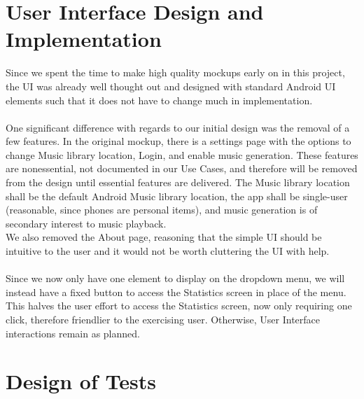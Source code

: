\documentclass[letterpaper,english, 12pt]{scrreprt}
\begin{document}
\chapter{User Interface Design and Implementation}
Since we spent the time to make high quality mockups early on in this project, the UI was already well thought out and designed with standard Android UI elements such that it does not have to change much in implementation.\\
\\
One significant difference with regards to our initial design was the removal of a few features.
In the original mockup, there is a settings page with the options to change Music library location, Login, and enable music generation.
These features are nonessential, not documented in our Use Cases, and therefore will be removed from the design until essential features are delivered.
The Music library location shall be the default Android Music library location, the app shall be single-user (reasonable, since phones are personal items), and music generation is of secondary interest to music playback.\\
We also removed the About page, reasoning that the simple UI should be intuitive to the user and it would not be worth cluttering the UI with help.\\
\\
Since we now only have one element to display on the dropdown menu, we will instead have a fixed button to access the Statistics screen in place of the menu.
This halves the user effort to access the Statistics screen, now only requiring one click, therefore friendlier to the exercising user.
Otherwise, User Interface interactions remain as planned.

\chapter{Design of Tests}
\end{document}

